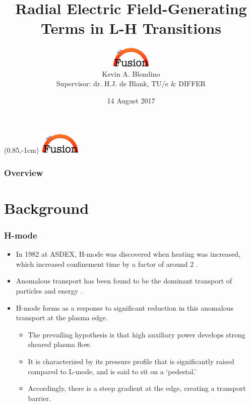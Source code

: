 \documentclass{beamer}
\title[$E_r$-Generating Terms in L-H Transitions]{Radial Electric Field-Generating Terms in L-H Transitions}
\author[K.A. Blondino]{\includegraphics[height=1cm]{../../Graphics/tue_fusion_logo.png} \\ Kevin A. Blondino \\
	Supervisor: dr. H.J. de Blank, TU/e \& DIFFER}
\institute[TU/e]{Eindhoven University of Technology \\
	\medskip
	\textit{k.blondino@student.tue.nl}}
\date{14 August 2017}
\begin{document}
\begin{frame}
\titlepage
\end{frame}

{
\begin{textblock*}{100mm}(0.85\textwidth,-1cm)
	\includegraphics[height=1cm,width=2cm]{../../Graphics/tue_fusion_logo.png}
\end{textblock*}
}

\begin{frame}
\frametitle{Overview}
\tableofcontents
\end{frame}


\section{Background}
\begin{frame}
\frametitle{H-mode}
\begin{itemize}
	\item In 1982 at ASDEX, H-mode was discovered when heating was increased, which increased confinement time by a factor of around 2 \parencite{wagner_development_1984}.
	\item Anomalous transport has been found to be the dominant transport of particles and energy \parencite{freidberg_plasma_2007}.
	\item H-mode forms as a response to significant reduction in this anomalous transport at the plasma edge.
	\begin{itemize}
		\item The prevailing hypothesis is that high auxiliary power develops strong sheared plasma flow.
		\item It is characterized by its pressure profile that is significantly raised compared to L-mode, and is said to sit on a `pedestal.'
		\item Accordingly, there is a steep gradient at the edge, creating a transport barrier.
	\end{itemize}
\end{itemize}
\end{frame}
\end{document}
